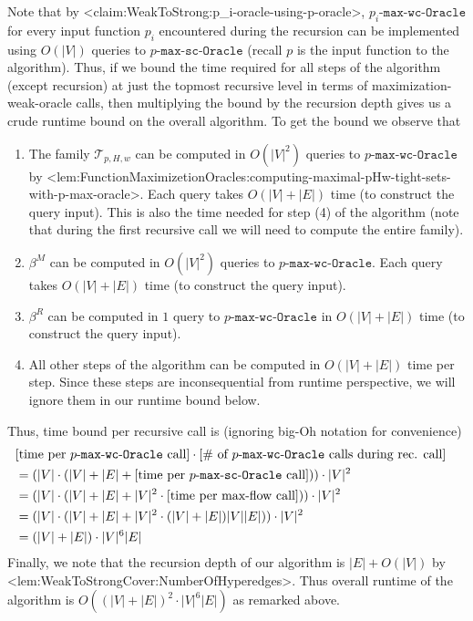 \documentclass{article}
\def\Cref#1{<#1>}%
\newcommand{\functionMaximizationOracle}[1]{\ensuremath{{#1}\text{-}\mathtt{max}\text{-}\mathtt{wc}\text{-}\mathtt{Oracle}}\xspace}
\newcommand{\functionMaximizationOracleStrongCover}[1]{\ensuremath{{#1}\text{-}\mathtt{max}\text{-}\mathtt{sc}\text{-}\mathtt{Oracle}}\xspace}
\newcommand{\maximalTightSetFamily}[1]{\ensuremath{\calT_{#1}}\xspace}
\providecommand{\calT}{\mathcal{T}}
\begin{document}
{    Note that by \Cref{claim:WeakToStrong:p_i-oracle-using-p-oracle}, \functionMaximizationOracle{p_i} for every input function $p_i$ encountered during the recursion can be implemented using $O(|V|)$ queries to $\functionMaximizationOracleStrongCover{p}$ (recall $p$ is the input function to the algorithm). Thus,  if we bound the time required for all steps of the algorithm (except recursion) at just the topmost recursive level in terms of maximization-weak-oracle calls, then multiplying the bound by the recursion depth gives us a crude runtime bound on the overall algorithm. To get the bound we observe that
    \begin{enumerate}
    \item The family $\maximalTightSetFamily{p, H, w}$ can be computed in $O(|V|^2)$ queries to $\functionMaximizationOracle{p}$ by \Cref{lem:FunctionMaximizetionOracles:computing-maximal-pHw-tight-sets-with-p-max-oracle}. Each query takes $O(|V| + |E|)$ time (to construct the query input).
     This is also the time needed for step (4) of the algorithm (note that during the first recursive call we will need to compute the entire family).
    \item $\beta^M$ can be computed in $O(|V|^2)$ queries to $\functionMaximizationOracle{p}$. Each query takes $O(|V| + |E|)$ time (to construct the query input).
    \item $\beta^R$ can be computed in $1$ query to $\functionMaximizationOracle{p}$ in $O(|V| + |E|)$ time (to construct the query input).
    \item All other steps of the algorithm can be computed in $O(|V| + |E|)$ time per step. Since these steps are inconsequential from runtime perspective, we will ignore them in our runtime bound below.
\end{enumerate}
Thus, time bound per recursive call is (ignoring big-Oh notation for convenience)
\begin{align*}
    &[\text{time per  \functionMaximizationOracle{p} call}] \cdot [\text{$\#$ of  \functionMaximizationOracle{p} calls during rec. call}] &\\
    & = (|V| \cdot (|V| + |E| + [\text{time per  \functionMaximizationOracleStrongCover{p} call}])) \cdot |V|^2&\\
    &= (|V| \cdot (|V| + |E| + |V|^2\cdot[\text{time per max-flow call}])) \cdot |V|^2&\\
    &= (|V| \cdot (|V| + |E| + |V|^2\cdot(|V|+|E|)|V||E|)) \cdot |V|^2&\\
    & = (|V| + |E|)\cdot|V|^{6}|E|&
\end{align*}
Finally, we note that the recursion depth of our algorithm is $|E| + O(|V|)$ by \Cref{lem:WeakToStrongCover:NumberOfHyperedges}. Thus overall runtime of the algorithm is $O((|V| + |E|)^2\cdot|V|^{6}|E|)$ as remarked above.
}
\fi
\end{document}
